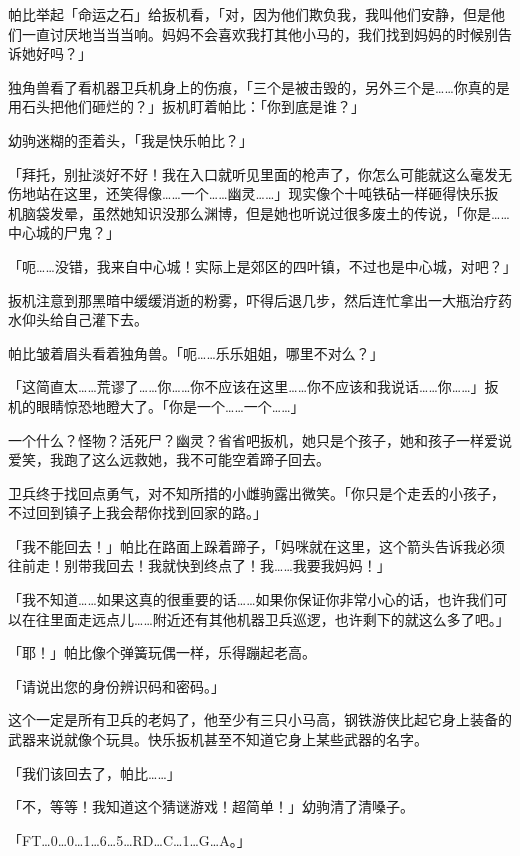 帕比举起「命运之石」给扳机看，「对，因为他们欺负我，我叫他们安静，但是他们一直讨厌地当当当响。妈妈不会喜欢我打其他小马的，我们找到妈妈的时候别告诉她好吗？」

独角兽看了看机器卫兵机身上的伤痕，「三个是被击毁的，另外三个是……你真的是用石头把他们砸烂的？」扳机盯着帕比：「你到底是谁？」

幼驹迷糊的歪着头，「我是快乐帕比？」

「拜托，别扯淡好不好！我在入口就听见里面的枪声了，你怎么可能就这么毫发无伤地站在这里，还笑得像……一个……幽灵……」现实像个十吨铁砧一样砸得快乐扳机脑袋发晕，虽然她知识没那么渊博，但是她也听说过很多废土的传说，「你是……中心城的尸鬼？」

「呃……没错，我来自中心城！实际上是郊区的四叶镇，不过也是中心城，对吧？」

扳机注意到那黑暗中缓缓消逝的粉雾，吓得后退几步，然后连忙拿出一大瓶治疗药水仰头给自己灌下去。

帕比皱着眉头看着独角兽。「呃……乐乐姐姐，哪里不对么？」

「这简直太……荒谬了……你……你不应该在这里……你不应该和我说话……你……」扳机的眼睛惊恐地瞪大了。「你是一个……一个……」

一个什么？怪物？活死尸？幽灵？省省吧扳机，她只是个孩子，她和孩子一样爱说爱笑，我跑了这么远救她，我不可能空着蹄子回去。

卫兵终于找回点勇气，对不知所措的小雌驹露出微笑。「你只是个走丢的小孩子，不过回到镇子上我会帮你找到回家的路。」

「我不能回去！」帕比在路面上跺着蹄子，「妈咪就在这里，这个箭头告诉我必须往前走！别带我回去！我就快到终点了！我……我要我妈妈！」

「我不知道……如果这真的很重要的话……如果你保证你非常小心的话，也许我们可以在往里面走远点儿……附近还有其他机器卫兵巡逻，也许剩下的就这么多了吧。」

「耶！」帕比像个弹簧玩偶一样，乐得蹦起老高。

\horizonline


「{\mtzh 请说出您的身份辨识码和密码。}」

这个一定是所有卫兵的老妈了，他至少有三只小马高，钢铁游侠比起它身上装备的武器来说就像个玩具。快乐扳机甚至不知道它身上某些武器的名字。

「我们该回去了，帕比……」

「不，等等！我知道这个猜谜游戏！超简单！」幼驹清了清嗓子。

「FT\dots 0\dots 0\dots 1\dots 6\dots 5\dots RD\dots C\dots 1\dots G\dots A。」

